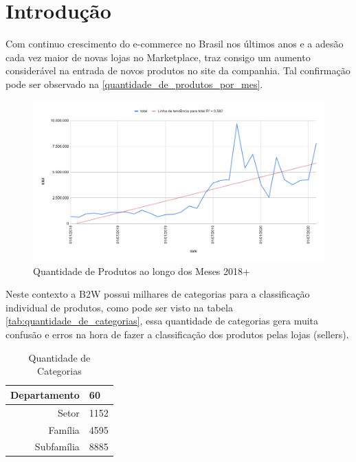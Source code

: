 \chapter[Introdução]{Introdução}

Com continuo crescimento do e-commerce no Brasil nos últimos anos e a adesão cada vez maior de novas lojas no Marketplace, traz consigo um aumento considerável na entrada de novos produtos no site da companhia. Tal confirmação pode ser observado na \autoref{quantidade_de_produtos_por_mes}.

\begin{figure}[htb]
	\caption{\label{quantidade_de_produtos_por_mes} Quantidade de Produtos ao longo dos Meses 2018+}
	\begin{center}
	    \includegraphics[width=\textwidth]{artigo/recursos/imagens/Quantidade de Produtos ao longo dos Meses 2018+.png}
	\end{center}
\end{figure}

Neste contexto a B2W possui milhares de categorias para a classificação individual de produtos, como pode ser visto na tabela \autoref{tab:quantidade_de_categorias}, essa quantidade de categorias gera muita confusão e erros na hora de fazer a classificação dos produtos pelas lojas (sellers).

\begin{table}[]
    \centering
    \caption{Quantidade de Categorias}
    \begin{tabular}{r|l} \hline
        Departamento & 60  \\ \hline
        Setor & 1152 \\ \hline
        Família & 4595 \\ \hline
        Subfamília & 8885 \\ \hline
    \end{tabular}
    \label{tab:quantidade_de_categorias}
\end{table}

